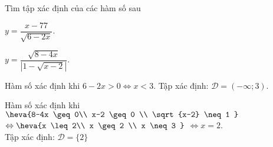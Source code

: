


\begin{bt}%
	Tìm tập xác định của các hàm số sau
	\begin{listEX}[2]
		\item $y=\dfrac{x-77}{\sqrt{6-2x}}$.
		\item $y=\dfrac{\sqrt{8-4x}}{\left|1-\sqrt{x-2}\right|}$.
	\end{listEX}
\loigiai
{
	\begin{listEX}
		\item Hàm số xác định khi $6-2x > 0 \Leftrightarrow x < 3$. Tập xác định: $\mathscr{D}=(-\infty; 3)$.
		\item Hàm số xác định khi $\heva{8-4x \geq 0\\ x-2 \geq 0 \\ \sqrt{x-2} \neq 1 }$ $\Leftrightarrow  \heva{x \leq 2\\ x \geq 2 \\ x \neq 3 }$ $\Leftrightarrow x=2$.\\
		Tập xác định: $\mathscr{D}=\big\{2\big\}$
	\end{listEX}
}
\end{bt}

